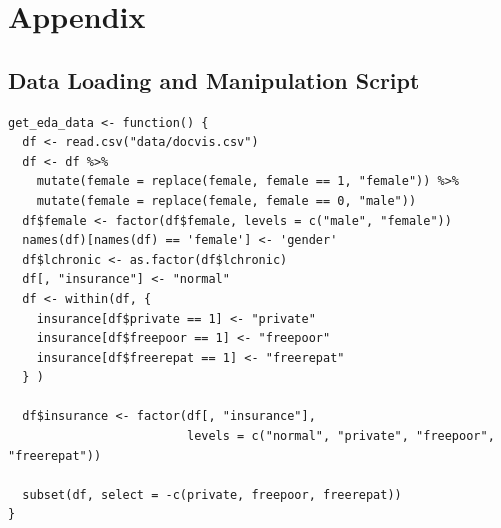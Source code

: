 \documentclass[a4paper,11pt]{article}
\begin{document}



\newpage

\section{Appendix}
\subsection{Data Loading and Manipulation Script}
\begin{verbatim}
get_eda_data <- function() {
  df <- read.csv("data/docvis.csv")
  df <- df %>%
    mutate(female = replace(female, female == 1, "female")) %>%
    mutate(female = replace(female, female == 0, "male"))
  df$female <- factor(df$female, levels = c("male", "female"))
  names(df)[names(df) == 'female'] <- 'gender'
  df$lchronic <- as.factor(df$lchronic)
  df[, "insurance"] <- "normal"
  df <- within(df, {
    insurance[df$private == 1] <- "private"
    insurance[df$freepoor == 1] <- "freepoor"
    insurance[df$freerepat == 1] <- "freerepat"
  } )

  df$insurance <- factor(df[, "insurance"],
                         levels = c("normal", "private", "freepoor", "freerepat"))

  subset(df, select = -c(private, freepoor, freerepat))
}
\end{verbatim}
\end{document}
